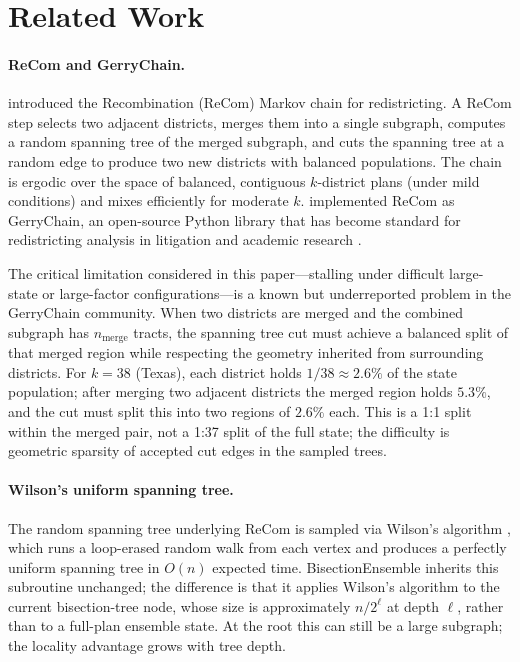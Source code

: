 \section{Related Work}
\label{sec:related}

\paragraph{ReCom and GerryChain.}
\citet{deford2021recombination} introduced the Recombination (ReCom) Markov chain
for redistricting. A ReCom step selects two adjacent districts, merges them into
a single subgraph, computes a random spanning tree of the merged subgraph,
and cuts the spanning tree at a random edge to produce two new districts with
balanced populations. The chain is ergodic over the space of balanced, contiguous
$k$-district plans (under mild conditions) and mixes efficiently for moderate $k$.
\citet{duchin2019gerrychain} implemented ReCom as GerryChain, an open-source
Python library that has become standard for redistricting analysis in litigation
and academic research \citep{herschlag2020quantifying, chikina2017assessing}.

The critical limitation considered in this paper---stalling under difficult
large-state or large-factor configurations---is a known but underreported
problem in the GerryChain community.
When two districts are merged and the combined subgraph has $n_{\text{merge}}$
tracts, the spanning tree cut must achieve a balanced split of that merged
region while respecting the geometry inherited from surrounding districts.
For $k=38$ (Texas), each district
holds $1/38 \approx 2.6\%$ of the state population; after merging two adjacent
districts the merged region holds $5.3\%$, and the cut must split this into two
regions of $2.6\%$ each. This is a 1:1 split within the merged pair, not a
1:37 split of the full state; the difficulty is geometric sparsity of accepted
cut edges in the sampled trees.

\paragraph{Wilson's uniform spanning tree.}
The random spanning tree underlying ReCom is sampled via Wilson's algorithm
\citep{wilson1996generating}, which runs a loop-erased random walk from each
vertex and produces a perfectly uniform spanning tree in $O(n)$ expected time.
BisectionEnsemble inherits this subroutine unchanged; the difference is that
it applies Wilson's algorithm to the current bisection-tree node, whose size is
approximately $n/2^\ell$ at depth $\ell$, rather than to a full-plan ensemble
state. At the root this can still be a large subgraph; the locality advantage
grows with tree depth.


